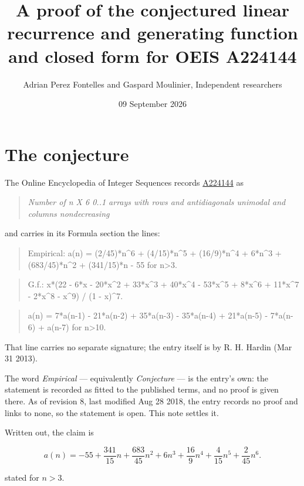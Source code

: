 \documentclass[11pt]{article}
\title{A proof of the conjectured linear recurrence and generating function and closed form for OEIS A224144}
\author{Adrian Perez Fontelles and Gaspard Moulinier, Independent researchers}
\date{09 September 2026}
\theoremstyle{definition}
\begin{document}
\maketitle
\section{The conjecture}

The Online Encyclopedia of Integer Sequences records \href{https://oeis.org/A224144}{A224144} as

\begin{quote}\itshape Number of n X 6 0..1 arrays with rows and antidiagonals unimodal and columns nondecreasing\end{quote}

and carries in its Formula section the lines:

\begin{quote}\ttfamily Empirical: a(n) = (2/45)*n\textasciicircum{}6 + (4/15)*n\textasciicircum{}5 + (16/9)*n\textasciicircum{}4 + 6*n\textasciicircum{}3 + (683/45)*n\textasciicircum{}2 + (341/15)*n - 55 for n>3.\end{quote}

\begin{quote}\ttfamily G.f.: x*(22 - 6*x - 20*x\textasciicircum{}2 + 33*x\textasciicircum{}3 + 40*x\textasciicircum{}4 - 53*x\textasciicircum{}5 + 8*x\textasciicircum{}6 + 11*x\textasciicircum{}7 - 2*x\textasciicircum{}8 - x\textasciicircum{}9) / (1 - x)\textasciicircum{}7.\end{quote}

\begin{quote}\ttfamily a(n) = 7*a(n-1) - 21*a(n-2) + 35*a(n-3) - 35*a(n-4) + 21*a(n-5) - 7*a(n-6) + a(n-7) for n>10.\end{quote}

That line carries no separate signature; the entry itself is by R. H. Hardin (Mar 31 2013).

The word {\itshape Empirical} --- equivalently {\itshape Conjecture} --- is the entry's own: the statement is recorded as fitted to the published terms, and no proof is given there. As of revision 8, last modified Aug 28 2018, the entry records no proof and links to none, so the statement is open. This note settles it.

Written out, the claim is

\[a(n) = -55 + \frac{341}{15}n + \frac{683}{45}n^{2} + 6n^{3} + \frac{16}{9}n^{4} + \frac{4}{15}n^{5} + \frac{2}{45}n^{6}.\]

stated for $n > 3$.
\end{document}
